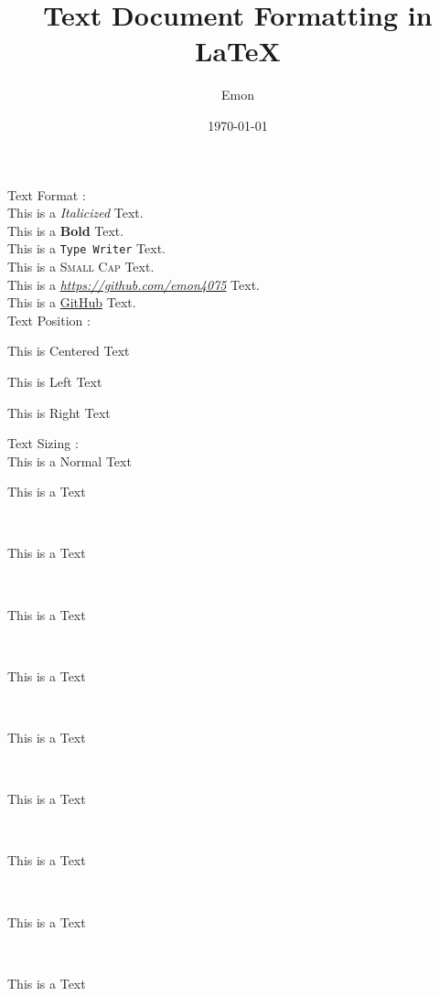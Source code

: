 \documentclass[11pt]{article}
\title{Text Document Formatting in \LaTeX}
\author{Emon}
\date{\today}
\begin{document}
\tableofcontents
\maketitle

Text Format : \\[1cm]
This is a \textit{Italicized} Text.\\
This is a \textbf{Bold} Text.\\
This is a \texttt{Type Writer} Text.\\
This is a \textsc{Small Cap} Text.\\
This is a \textit{\url{https://github.com/emon4075}} Text. \\
This is a \href{https://github.com/emon4075}{GitHub} Text.\\

Text Position : \\[1cm] 

\begin{center}
This is Centered Text
\end{center}

\begin{flushleft}
This is Left Text
\end{flushleft}

\begin{flushright}
This is Right Text
\end{flushright}

Text Sizing : \\[1cm] 
This is a Normal Text\\
\begin{large} This is a Text \end{large}\\
\begin{Large}This is a Text\end{Large}\\
\begin{huge}This is a Text\end{huge}\\
\begin{Huge}This is a Text\end{Huge}\\
\begin{Large}This is a Text\end{Large}\\
\begin{normalsize}This is a Text\end{normalsize}\\
\begin{small}This is a Text\end{small}\\
\begin{scriptsize}This is a Text\end{scriptsize}\\
\begin{tiny}This is a Text\end{tiny}\\
\end{document}
